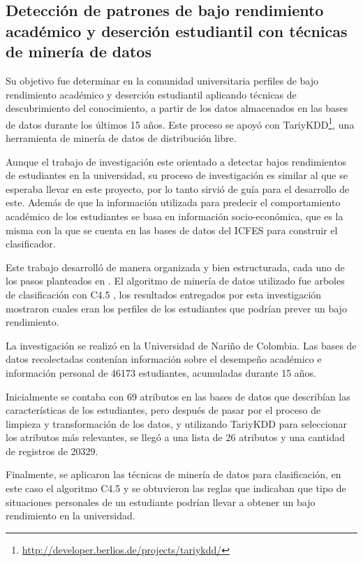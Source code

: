 \subsection{Detección de patrones de bajo rendimiento académico y deserción estudiantil con técnicas de minería de datos \cite{key-100}}
Su objetivo fue determinar en la comunidad universitaria perfiles de bajo rendimiento académico y deserción estudiantil aplicando técnicas de descubrimiento del conocimiento, a partir de los datos almacenados en las bases de datos durante los últimos 15 años. Este proceso se apoyó con TariyKDD\footnote{\url{http://developer.berlios.de/projects/tariykdd/}}, una herramienta de minería de datos de distribución libre.

Aunque el trabajo de investigación este orientado a detectar bajos rendimientos de estudiantes en la universidad, su proceso de investigación es similar al que se esperaba llevar en este proyecto, por lo tanto sirvió de guía para el desarrollo de este. Además de que la información utilizada para predecir el comportamiento académico de los estudiantes se basa en información socio-económica, que es la misma con la que se cuenta en las bases de datos del ICFES para construir el clasificador.

Este trabajo desarrolló de manera organizada y bien estructurada, cada uno de los pasos planteados en \cite{key-50}. El algoritmo de minería de datos utilizado fue arboles de clasificación con C4.5 \cite{key-50, key-70}, los resultados entregados por esta investigación mostraron cuales eran los perfiles de los estudiantes que podrían prever un bajo rendimiento.

La investigación se realizó en la Universidad de Nariño de Colombia. Las bases de datos recolectadas contenían información sobre el desempeño académico e información personal de 46173 estudiantes, acumuladas durante 15 años.

Inicialmente se contaba con 69 atributos en las bases de datos que describían las características de los estudiantes, pero después de pasar por el proceso de limpieza y transformación de los datos, y utilizando TariyKDD para seleccionar los atributos más relevantes, se llegó a una lista de 26 atributos y una cantidad de registros de 20329.

Finalmente, se aplicaron las técnicas de minería de datos para clasificación, en este caso el algoritmo C4.5 y se obtuvieron las reglas que indicaban que tipo de situaciones personales de un estudiante podrían llevar a obtener un bajo rendimiento en la universidad.

